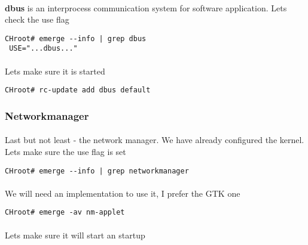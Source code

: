 \documentclass[10pt,a4paper]{article}
\begin{document}
                    \paragraph{} \textbf{dbus} is an interprocess communication system for software application. Lets check the use flag

                    \begin{lstlisting}[style=BashInputCHRoot]
 CHroot# emerge --info | grep dbus
 USE="...dbus..."
                    \end{lstlisting}

                    \paragraph{} Lets make sure it is started

                    \begin{lstlisting}[style=BashInputCHRoot]
 CHroot# rc-update add dbus default
                    \end{lstlisting}

                \newpage
                \subsubsection{Networkmanager}

                    \paragraph{} Last but not least - the network manager. We have already configured the kernel. Lets make sure the use flag is set

                    \begin{lstlisting}[style=BashInputCHRoot]
 CHroot# emerge --info | grep networkmanager
                    \end{lstlisting}

                    \paragraph{} We will need an implementation to use it, I prefer the GTK one

                    \begin{lstlisting}[style=BashInputCHRoot]
 CHroot# emerge -av nm-applet
                    \end{lstlisting}

                    \paragraph{} Lets make sure it will start an startup
\end{document}
